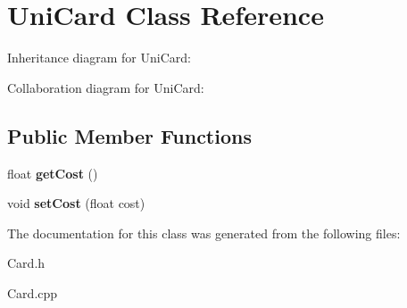 \hypertarget{classUniCard}{}\section{Uni\+Card Class Reference}
\label{classUniCard}


Inheritance diagram for Uni\+Card\+:


Collaboration diagram for Uni\+Card\+:
\subsection*{Public Member Functions}
\begin{DoxyCompactItemize}
\item 
\mbox{\label{classUniCard_af989646a659efd6f91aad162a1d98562}} 
float {\bfseries get\+Cost} ()
\item 
\mbox{\label{classUniCard_a296b5dc94b24347f66c10e6bf51f38f7}} 
void {\bfseries set\+Cost} (float cost)
\end{DoxyCompactItemize}


The documentation for this class was generated from the following files\+:\begin{DoxyCompactItemize}
\item 
Card.\+h\item 
Card.\+cpp\end{DoxyCompactItemize}
